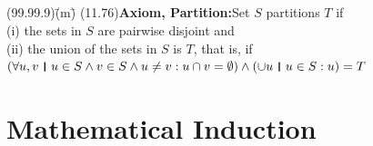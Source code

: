 \documentclass{amsart}
\newcommand{\lgap}{2pt}                             %
\newcommand{\thedr}{\rule[-.25ex]{.32mm}{1.75ex}}   %
\newcommand{\dr}{\;\,\thedr\,\;}                    %
\newcommand{\rb}{:}                                 %
\newcommand{\all}{\forall}                          %
\begin{document}
\subsection*{}
\begin{tabbing}
(99.99.9)\;\=(m)\;\=\kill
(11.76)\>\textbf{Axiom, Partition:}\quad Set $S$ partitions $T$ if\\[\lgap]
           \>(i)\> the sets in $S$ are pairwise disjoint and\\[\lgap]
           \>(ii)\> the union of the sets in $S$ is $T$, that is, if\\[\lgap]
           \>$(\all u, v\dr u\in S\land v\in S\land u\ne v\rb u\cap v = \emptyset)\land (\cup u\dr u\in S\rb u) = T$\\[\lgap]
\end{tabbing}

\section*{Mathematical Induction}
\end{document}
